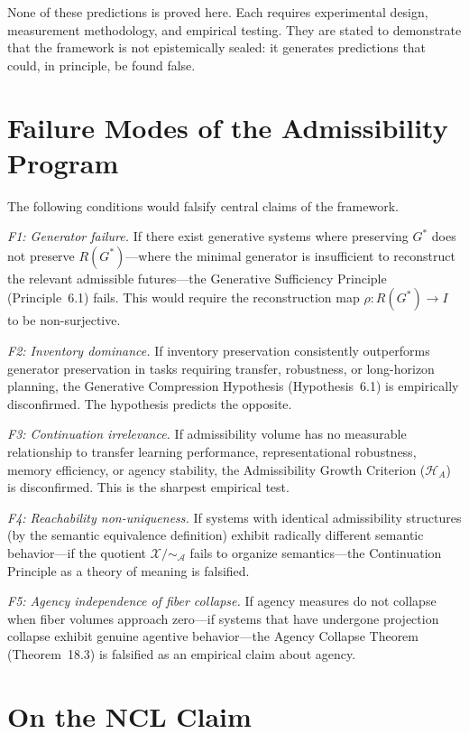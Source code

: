 \documentclass[12pt, oneside]{book}
\theoremstyle{flyxion}
\theoremstyle{definition}
\begin{document}
None of these predictions is proved here. Each requires experimental
design, measurement methodology, and empirical testing. They are
stated to demonstrate that the framework is not epistemically sealed:
it generates predictions that could, in principle, be found false.

\section{Failure Modes of the Admissibility Program}

The following conditions would falsify central claims of the
framework.

\textit{F1: Generator failure.} If there exist generative systems
where preserving $G^*$ does not preserve $R(G^*)$---where the minimal
generator is insufficient to reconstruct the relevant admissible
futures---the Generative Sufficiency Principle (Principle~6.1) fails.
This would require the reconstruction map $\rho : R(G^*) \to I$ to
be non-surjective.

\textit{F2: Inventory dominance.} If inventory preservation
consistently outperforms generator preservation in tasks requiring
transfer, robustness, or long-horizon planning, the Generative
Compression Hypothesis (Hypothesis~6.1) is empirically disconfirmed.
The hypothesis predicts the opposite.

\textit{F3: Continuation irrelevance.} If admissibility volume has
no measurable relationship to transfer learning performance,
representational robustness, memory efficiency, or agency stability,
the Admissibility Growth Criterion ($\mathcal{H}_A$) is disconfirmed.
This is the sharpest empirical test.

\textit{F4: Reachability non-uniqueness.} If systems with identical
admissibility structures (by the semantic equivalence definition)
exhibit radically different semantic behavior---if the quotient
$\mathcal{X}/{\sim_\mathcal{A}}$ fails to organize semantics---the
Continuation Principle as a theory of meaning is falsified.

\textit{F5: Agency independence of fiber collapse.} If agency
measures do not collapse when fiber volumes approach zero---if systems
that have undergone projection collapse exhibit genuine agentive
behavior---the Agency Collapse Theorem (Theorem~18.3) is falsified
as an empirical claim about agency.

\section{On the NCL Claim}
\end{document}
